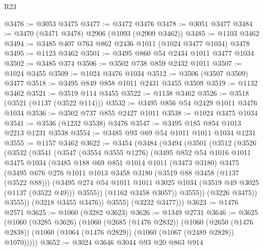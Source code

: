 \begin{lexlean}{R23}
\begin{coremodule}
@3476 := @3053 @3475
@3477 := @3472 @3476
@3478 := @3051 @3477
@3484 := @3470 (@3471 @3478) @2906 (@1093 (@2909 @3462))
@3485 := @1103 @3462
@3494 := @3485 @407 @763 @862 @2436 @1011 (@1024 @3477 @1034) @3478
@3495 := @1123 @3462
@3501 := @3495 @860 @54 @2434 @1011 @3477 @1034
@3502 := @3485 @374
@3506 := @3502 @738 @859 @2432 @1011
@3507 := @1024 @3455
@3509 := @1024 @3476 @1034
@3512 := @3506 (@3507 @3509) @3477
@3518 := @3495 @849 @858 @1011 @2431 @3455 @3509
@3519 := @1132 @3462
@3521 := @3519 @114 @3455
@3522 := @1138 @3462
@3526 := @3518 (@3521 (@1137 (@3522 @114)))
@3532 := @3495 @856 @54 @2429 @1011 @3476 @1034
@3536 := @3502 @737 @855 @2427 @1011
@3538 := @1024 @3475 @1034
@3541 := @3536 (@1232 @3538) @3476
@3547 := @3495 @185 @854 @1013 @2213 @1231 @3538
@3554 := @3485 @93 @69 @54 @1011 @1011 @1034 @1231
@3555 := @1157 @3462
@3622 := @3454
    (@3484
      (@3494
        (@3501
          (@3512
            (@3526
              (@3532
                (@3541
                  (@3547
                    (@3554 @3555 @1276)
                    (@3495
                      @852
                      @54
                      @1016
                      @1011
                      @3475
                      @1034
                      (@3485
                        @188
                        @69
                        @851
                        @1014
                        @1011
                        (@3473 @3180)
                        @3475
                        (@3495
                          @676
                          @276
                          @1011
                          @1013
                          @3458
                          @3180
                          (@3519 @88 @3458 (@1137 (@3522 @88)))
                          (@3495
                            @274
                            @54
                            @1011
                            @1011
                            @3025
                            @1034
                            (@3519 @49 @3025 (@1137 (@3522 @49)))
                            @3555))
                        (@1162 @3458 @3057))
                      @3555))
                  (@3226 @3475))
                @3555))
            (@3218 @3455 @3476))
          @3555)
        (@3232 @3477)))
@3623 := @1476 @2571
@3625 := @1060 (@3282 @3623)
@3626 := @1349 @2731
@3646 := @3625
    (@1060
      (@3285 @3626)
      (@1060
        (@2685 (@1476 @2832))
        (@1060
          (@2650 (@1476 @2838))
          (@1060 (@1064 (@1476 @2829)) (@1060 (@1067 (@2489 @2828)) @1070)))))
@3652 := @3024 @3646 @3044 @93 @20 @863 @914

\end{coremodule}
\end{lexlean}
